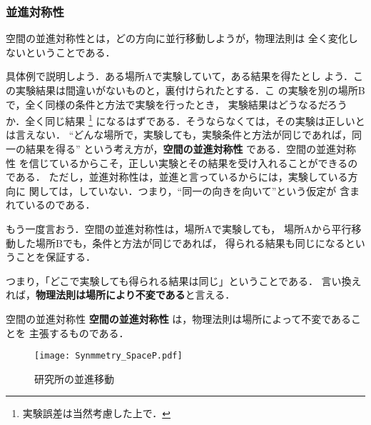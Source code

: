             \subsubsection{並進対称性}
                空間の並進対称性とは，どの方向に並行移動しようが，物理法則は
                全く変化しないということである．

                具体例で説明しよう．ある場所Aで実験していて，ある結果を得たとし
                よう．この実験結果は間違いがないものと，裏付けられたとする．こ
                の実験を別の場所Bで，全く同様の条件と方法で実験を行ったとき，
                実験結果はどうなるだろうか．全く同じ結果
                    \footnote{
                        実験誤差は当然考慮した上で．
                    }
                になるはずである．そうならなくては，その実験は正しいとは言えない．
                “どんな場所で，実験しても，実験条件と方法が同じであれば，同一の結果を得る”
                という考え方が，\textbf{空間の並進対称性} である．空間の並進対称性
                を信じているからこそ，正しい実験とその結果を受け入れることができるのである．
                ただし，並進対称性は，並進と言っているからには，実験している方向に
                関しては，していない．つまり，“同一の向きを向いて”という仮定が
                含まれているのである．

                もう一度言おう．空間の並進対称性は，場所Aで実験しても，
                場所Aから平行移動した場所Bでも，条件と方法が同じであれば，
                得られる結果も同じになるということを保証する．

                つまり，「どこで実験しても得られる結果は同じ」ということである．
                言い換えれば，\textbf{物理法則は場所により不変である}と言える．
                    \begin{myshadebox}{空間の並進対称性}
                        \textbf{空間の並進対称性} は，物理法則は場所によって不変であることを
                        主張するものである．
                    \end{myshadebox}

                    \begin{figure}[hbt]
                        \begin{center}
                            \texttt{[image: Synmmetry\_SpaceP.pdf]}
                            \caption{研究所の並進移動}
                            \label{fig:Synmmetry_SpaceP}
                        \end{center}
                    \end{figure}


